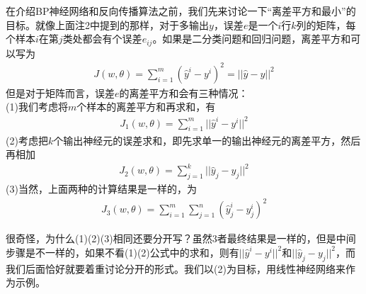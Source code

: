 {                \par
                在介绍BP神经网络和反向传播算法之前，我们先来讨论一下“离差平方和最小”的目标。就像上面注2中提到的那样，对于多输出$y$，误差$e$是一个$i$行$k$列的矩阵，每个样本$i$在第$j$类处都会有个误差$e_{ij}$。如果是二分类问题和回归问题，离差平方和可以写为
                \begin{align*}
                J(w,\theta) = \sum_{i=1}^m(\hat{y}^i - y^i)^2 = ||\hat{y} - y||^2
                \end{align*}
                但是对于矩阵而言，误差$e$的离差平方和会有三种情况：\\
                (1)我们考虑将$m$个样本的离差平方和再求和，有
                \begin{align*}
                J_1(w,\theta) = \sum_{i=1}^m||\hat{y}^i - y^i||^2
                \end{align*}
                (2)考虑把$k$个输出神经元的误差求和，即先求单一的输出神经元的离差平方，然后再相加
                \begin{align*}
                J_2(w,\theta) = \sum_{j=1}^k||\hat{y}_j - y_j||^2
                \end{align*}
                (3)当然，上面两种的计算结果是一样的，为
                \begin{align*}
                J_3 (w,\theta) = \sum_{i=1}^m\sum_{j=1}^n (\hat{y}_j^i - y_j^i)^2
                \end{align*}
                \par
                很奇怪，为什么(1)(2)(3)相同还要分开写？虽然3者最终结果是一样的，但是中间步骤是不一样的，如果不看(1)(2)公式中的求和，则有$||\hat{y}^i - y^i||^2$和$||\hat{y}_j - y_j||^2$，而我们后面恰好就要着重讨论分开的形式。我们以(2)为目标，用线性神经网络来作为示例。

}
